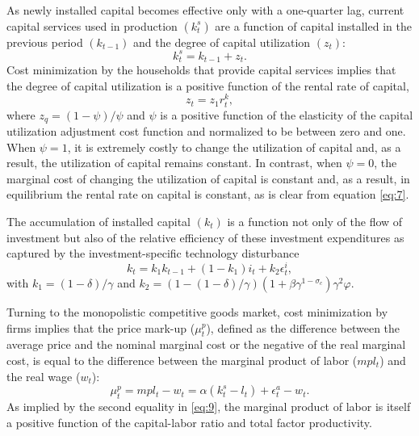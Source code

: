 \documentclass[11pt]{article}
\newcommand{\iobs}[1]{i_{#1}}
\newcommand{\wobs}[1]{w_{#1}}
\newcommand{\lobs}[1]{l_{#1}}
\newcommand{\investment}{investment}
\newcommand{\labor}{labor}
\newcommand{\wage}{wage}
\begin{document}
As newly installed capital becomes effective only with a one-quarter
lag, current capital services used in production \((k_t^s)\) are a
function of capital installed in the previous period \((k_{t-1})\) and
the degree of capital utilization \((z_t)\): \begin{equation}
  k_t^s = k_{t-1} + z_t.
\end{equation} Cost minimization by the households that provide capital
services implies that the degree of capital utilization is a positive
function of the rental rate of capital, \begin{equation}
  \label{eq:7}
  z_t = z_1 r_t^k,
\end{equation} where \(z_q = (1-\psi)/\psi\) and \(\psi\) is a positive
function of the elasticity of the capital utilization adjustment cost
function and normalized to be between zero and one. When \(\psi=1\), it
is extremely costly to change the utilization of capital and, as a
result, the utilization of capital remains constant. In contrast, when
\(\psi=0\), the marginal cost of changing the utilization of capital is
constant and, as a result, in equilibrium the rental rate on capital is
constant, as is clear from equation \eqref{eq:7}.

The accumulation of installed capital \((k_t)\) is a function not only
of the flow of \investment{} but also of the relative efficiency of
these \investment{} expenditures as captured by the \investment-specific
technology disturbance \begin{equation}
  \label{eq:8}
  k_t = k_1 k_{t-1} + (1-k_1) \iobs{t} + k_2 \epsilon_{t}^i,
\end{equation} with \(k_1=(1-\delta)/\gamma\) and
\(k_2 = (1-(1-\delta)/\gamma) (1+ \beta\gamma^{1-\sigma_c})\gamma^2\varphi.\)

Turning to the monopolistic competitive goods market, cost minimization
by firms implies that the price mark-up (\(\mu_t^p\)), defined as the
difference between the average price and the nominal marginal cost or
the negative of the real marginal cost, is equal to the difference
between the marginal product of \labor{} (\(mp\lobs{t}\)) and the real
\wage{} (\(\wobs{t}\)): \begin{equation}
  \label{eq:9}
  \mu_t^p = mp\lobs{t} - \wobs{t} = \alpha(k_t^s - \lobs{t}) +
  \epsilon_t^a - \wobs{t}.
\end{equation} As implied by the second equality in \eqref{eq:9}, the
marginal product of \labor{} is itself a positive function of the
capital-\labor{} ratio and total factor productivity.
\end{document}
